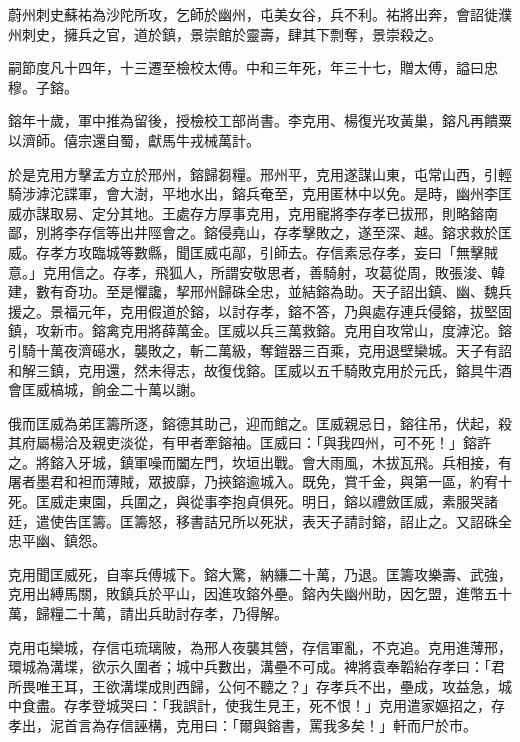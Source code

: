 \begin{pinyinscope}
 蔚州刺史蘇祐為沙陀所攻，乞師於幽州，屯美女谷，兵不利。祐將出奔，會詔徙濮州刺史，擁兵之官，道於鎮，景崇館於靈壽，肆其下剽奪，景崇殺之。



 嗣節度凡十四年，十三遷至檢校太傅。中和三年死，年三十七，贈太傅，謚曰忠穆。子鎔。



 鎔年十歲，軍中推為留後，授檢校工部尚書。李克用、楊復光攻黃巢，鎔凡再饋粟以濟師。僖宗還自蜀，獻馬牛戎械萬計。



 於是克用方擊孟方立於邢州，鎔歸芻糧。邢州平，克用遂謀山東，屯常山西，引輕騎涉滹沱諜軍，會大澍，平地水出，鎔兵奄至，克用匿林中以免。是時，幽州李匡威亦謀取易、定分其地。王處存方厚事克用，克用寵將李存孝已拔邢，則略鎔南鄙，別將李存信等出井陘會之。鎔侵堯山，存孝擊敗之，遂至深、越。鎔求救於匡威。存孝方攻臨城等數縣，聞匡威屯鄗，引師去。存信素忌存孝，妄曰「無擊賊意。」克用信之。存孝，飛狐人，所謂安敬思者，善騎射，攻葛從周，敗張浚、韓建，數有奇功。至是懼讒，挈邢州歸硃全忠，並結鎔為助。天子詔出鎮、幽、魏兵援之。景福元年，克用假道於鎔，以討存孝，鎔不答，乃與處存連兵侵鎔，拔堅固鎮，攻新市。鎔禽克用將薛萬金。匡威以兵三萬救鎔。克用自攻常山，度滹沱。鎔引騎十萬夜濟礠水，襲敗之，斬二萬級，奪鎧器三百乘，克用退壁欒城。天子有詔和解三鎮，克用還，然未得志，故復伐鎔。匡威以五千騎敗克用於元氏，鎔具牛酒會匡威槁城，餉金二十萬以謝。



 俄而匡威為弟匡籌所逐，鎔德其助己，迎而館之。匡威親忌日，鎔往吊，伏起，殺其府屬楊洽及親吏淡從，有甲者牽鎔袖。匡威曰：「與我四州，可不死！」鎔許之。將鎔入牙城，鎮軍噪而闔左門，坎垣出戰。會大雨風，木拔瓦飛。兵相接，有屠者墨君和袒而薄賊，眾披靡，乃挾鎔逾城入。既免，賞千金，與第一區，約宥十死。匡威走東園，兵圍之，與從事李抱貞俱死。明日，鎔以禮斂匡威，素服哭諸廷，遣使告匡籌。匡籌怒，移書詰兄所以死狀，表天子請討鎔，詔止之。又詔硃全忠平幽、鎮怨。



 克用聞匡威死，自率兵傅城下。鎔大驚，納縑二十萬，乃退。匡籌攻樂壽、武強，克用出縛馬關，敗鎮兵於平山，因進攻鎔外壘。鎔內失幽州助，因乞盟，進幣五十萬，歸糧二十萬，請出兵助討存孝，乃得解。



 克用屯欒城，存信屯琉璃陂，為邢人夜襲其營，存信軍亂，不克追。克用進薄邢，環城為溝堞，欲示久圍者；城中兵數出，溝壘不可成。裨將袁奉韜紿存孝曰：「君所畏唯王耳，王欲溝堞成則西歸，公何不聽之？」存孝兵不出，壘成，攻益急，城中食盡。存孝登城哭曰：「我誤計，使我生見王，死不恨！」克用遣家嫗招之，存孝出，泥首言為存信誣構，克用曰：「爾與鎔書，罵我多矣！」軒而尸於市。




\end{pinyinscope}
